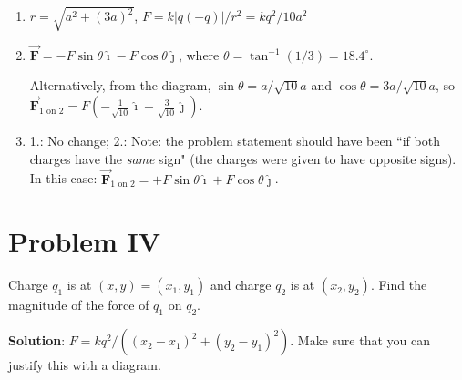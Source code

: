 \documentclass{article}
\renewcommand{\mbox}{\text}
\newcommand{\ds}[0]{\displaystyle}
\newcommand{\ihat}[0]{\hat{\boldsymbol{\imath}}}
\newcommand{\jhat}[0]{\hat{\boldsymbol{\jmath}}}
\newcommand{\bfvec}[1]{\vec{\mathbf{#1}}}
\begin{document}
    \begin{enumerate}

      \item $r=\sqrt{a^2+(3a)^2}$, $F=k|q(-q)|/r^2=kq^2/10a^2$

      \item $\bfvec{F}=-F\sin\theta\ihat - F\cos\theta\jhat$, where $\theta=\tan^{-1}(1/3)=18.4^\circ$.

                Alternatively, from the diagram, $\sin\theta = a/\sqrt{10}a$ and $\cos\theta = 3a/\sqrt{10}a$, so 
                $\ds\bfvec{F}_{1\mbox{ on } 2} = F\left(-\frac{1}{\sqrt{10}}\ihat - \frac{3}{\sqrt{10}}\jhat\right)$.

      \item 1.: No change; 2.: Note: the problem statement should have been ``if both charges have the \emph{same} sign" (the charges were given to have opposite signs). In this case: $\bfvec{F}_{1\mbox{ on } 2}=+F\sin\theta\ihat + F\cos\theta\jhat$.

    \end{enumerate}
\else


\fi
\ifsolutions\else

\fi

\section{Problem IV}

Charge $q_1$ is at $(x,y)=(x_1,y_1)$ and charge $q_2$ is at $(x_2, y_2)$. Find the magnitude of the force of $q_1$ on $q_2$.

\ifsolutions
{\bf Solution}: $F=kq^2/\left((x_2-x_1)^2 + (y_2-y_1)^2\right)$. Make sure that you can justify this with a diagram.
\fi
\end{document}
